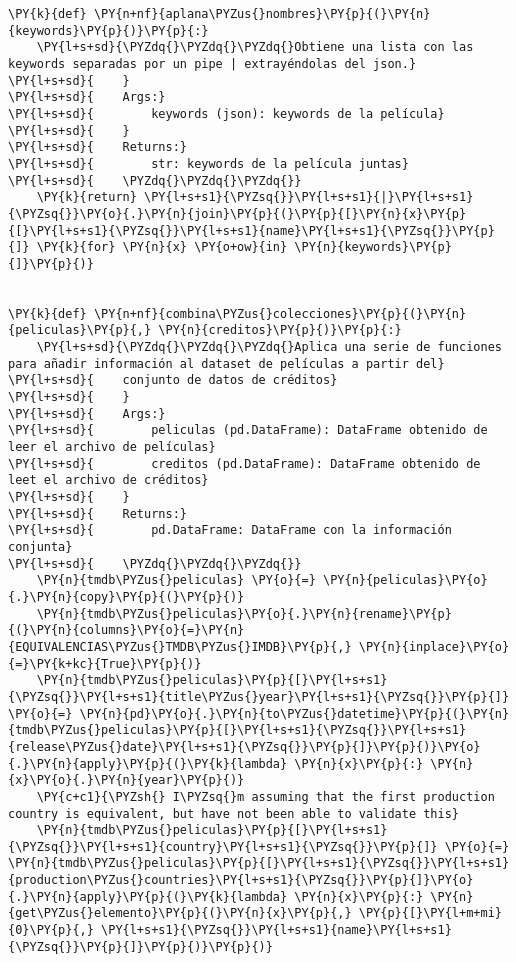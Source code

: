 \begin{tcolorbox}[breakable, size=fbox, boxrule=1pt, pad at break*=1mm,colback=cellbackground, colframe=cellborder]
\begin{Verbatim}[commandchars=\\\{\}]
\PY{k}{def} \PY{n+nf}{aplana\PYZus{}nombres}\PY{p}{(}\PY{n}{keywords}\PY{p}{)}\PY{p}{:}
    \PY{l+s+sd}{\PYZdq{}\PYZdq{}\PYZdq{}Obtiene una lista con las keywords separadas por un pipe | extrayéndolas del json.}
\PY{l+s+sd}{    }
\PY{l+s+sd}{    Args:}
\PY{l+s+sd}{        keywords (json): keywords de la película}
\PY{l+s+sd}{    }
\PY{l+s+sd}{    Returns:}
\PY{l+s+sd}{        str: keywords de la película juntas}
\PY{l+s+sd}{    \PYZdq{}\PYZdq{}\PYZdq{}}
    \PY{k}{return} \PY{l+s+s1}{\PYZsq{}}\PY{l+s+s1}{|}\PY{l+s+s1}{\PYZsq{}}\PY{o}{.}\PY{n}{join}\PY{p}{(}\PY{p}{[}\PY{n}{x}\PY{p}{[}\PY{l+s+s1}{\PYZsq{}}\PY{l+s+s1}{name}\PY{l+s+s1}{\PYZsq{}}\PY{p}{]} \PY{k}{for} \PY{n}{x} \PY{o+ow}{in} \PY{n}{keywords}\PY{p}{]}\PY{p}{)}


\PY{k}{def} \PY{n+nf}{combina\PYZus{}colecciones}\PY{p}{(}\PY{n}{peliculas}\PY{p}{,} \PY{n}{creditos}\PY{p}{)}\PY{p}{:}
    \PY{l+s+sd}{\PYZdq{}\PYZdq{}\PYZdq{}Aplica una serie de funciones para añadir información al dataset de películas a partir del}
\PY{l+s+sd}{    conjunto de datos de créditos}
\PY{l+s+sd}{    }
\PY{l+s+sd}{    Args:}
\PY{l+s+sd}{        peliculas (pd.DataFrame): DataFrame obtenido de leer el archivo de películas}
\PY{l+s+sd}{        creditos (pd.DataFrame): DataFrame obtenido de leet el archivo de créditos}
\PY{l+s+sd}{    }
\PY{l+s+sd}{    Returns:}
\PY{l+s+sd}{        pd.DataFrame: DataFrame con la información conjunta}
\PY{l+s+sd}{    \PYZdq{}\PYZdq{}\PYZdq{}}
    \PY{n}{tmdb\PYZus{}peliculas} \PY{o}{=} \PY{n}{peliculas}\PY{o}{.}\PY{n}{copy}\PY{p}{(}\PY{p}{)}
    \PY{n}{tmdb\PYZus{}peliculas}\PY{o}{.}\PY{n}{rename}\PY{p}{(}\PY{n}{columns}\PY{o}{=}\PY{n}{EQUIVALENCIAS\PYZus{}TMDB\PYZus{}IMDB}\PY{p}{,} \PY{n}{inplace}\PY{o}{=}\PY{k+kc}{True}\PY{p}{)}
    \PY{n}{tmdb\PYZus{}peliculas}\PY{p}{[}\PY{l+s+s1}{\PYZsq{}}\PY{l+s+s1}{title\PYZus{}year}\PY{l+s+s1}{\PYZsq{}}\PY{p}{]} \PY{o}{=} \PY{n}{pd}\PY{o}{.}\PY{n}{to\PYZus{}datetime}\PY{p}{(}\PY{n}{tmdb\PYZus{}peliculas}\PY{p}{[}\PY{l+s+s1}{\PYZsq{}}\PY{l+s+s1}{release\PYZus{}date}\PY{l+s+s1}{\PYZsq{}}\PY{p}{]}\PY{p}{)}\PY{o}{.}\PY{n}{apply}\PY{p}{(}\PY{k}{lambda} \PY{n}{x}\PY{p}{:} \PY{n}{x}\PY{o}{.}\PY{n}{year}\PY{p}{)}
    \PY{c+c1}{\PYZsh{} I\PYZsq{}m assuming that the first production country is equivalent, but have not been able to validate this}
    \PY{n}{tmdb\PYZus{}peliculas}\PY{p}{[}\PY{l+s+s1}{\PYZsq{}}\PY{l+s+s1}{country}\PY{l+s+s1}{\PYZsq{}}\PY{p}{]} \PY{o}{=} \PY{n}{tmdb\PYZus{}peliculas}\PY{p}{[}\PY{l+s+s1}{\PYZsq{}}\PY{l+s+s1}{production\PYZus{}countries}\PY{l+s+s1}{\PYZsq{}}\PY{p}{]}\PY{o}{.}\PY{n}{apply}\PY{p}{(}\PY{k}{lambda} \PY{n}{x}\PY{p}{:} \PY{n}{get\PYZus{}elemento}\PY{p}{(}\PY{n}{x}\PY{p}{,} \PY{p}{[}\PY{l+m+mi}{0}\PY{p}{,} \PY{l+s+s1}{\PYZsq{}}\PY{l+s+s1}{name}\PY{l+s+s1}{\PYZsq{}}\PY{p}{]}\PY{p}{)}\PY{p}{)}

\end{Verbatim}
\end{tcolorbox}
